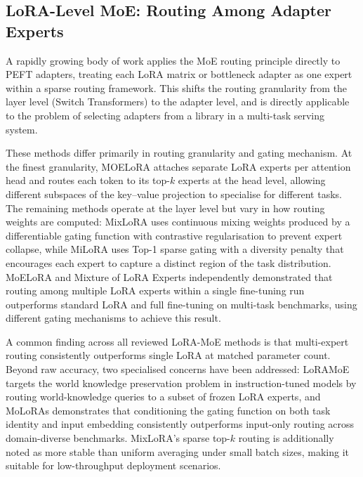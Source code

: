 \subsection{LoRA-Level MoE: Routing Among Adapter Experts}
\label{sec:moe_routing:lora_moe}

A rapidly growing body of work applies the MoE routing principle directly to PEFT
adapters, treating each LoRA matrix or bottleneck adapter as one expert within a
sparse routing framework. This shifts the routing granularity from the layer level
(Switch Transformers) to the adapter level, and is directly applicable to the problem
of selecting adapters from a library in a multi-task serving system.

These methods differ primarily in routing granularity and gating mechanism.
At the finest granularity, MOELoRA \cite{LiuWhenMOE2024} attaches separate LoRA experts
per attention head and routes each token to its top-$k$ experts at the head level,
allowing different subspaces of the key--value projection to specialise for different tasks.
The remaining methods operate at the layer level but vary in how routing weights are
computed: MixLoRA \cite{LiMixLoRA2024} uses continuous mixing weights produced by a
differentiable gating function with contrastive regularisation to prevent expert collapse,
while MiLoRA \cite{ZhangMiLoRA2024} uses Top-1 sparse gating with a diversity penalty
that encourages each expert to capture a distinct region of the task distribution.
MoELoRA \cite{LuoMoELoRA2024} and Mixture of LoRA Experts \cite{WuMixtureLoRA2024}
independently demonstrated that routing among multiple LoRA experts within a single
fine-tuning run outperforms standard LoRA and full fine-tuning on multi-task benchmarks,
using different gating mechanisms to achieve this result.

A common finding across all reviewed LoRA-MoE methods is that multi-expert routing
consistently outperforms single LoRA at matched parameter count. Beyond raw accuracy,
two specialised concerns have been addressed: LoRAMoE \cite{DouLoRAMoE2024} targets the
world knowledge preservation problem in instruction-tuned models by routing
world-knowledge queries to a subset of frozen LoRA experts, and MoLoRAs
\cite{FengMoLoRAs2024} demonstrates that conditioning the gating function on both task
identity and input embedding consistently outperforms input-only routing across
domain-diverse benchmarks. MixLoRA's sparse top-$k$ routing is additionally noted as
more stable than uniform averaging under small batch sizes, making it suitable for
low-throughput deployment scenarios.


